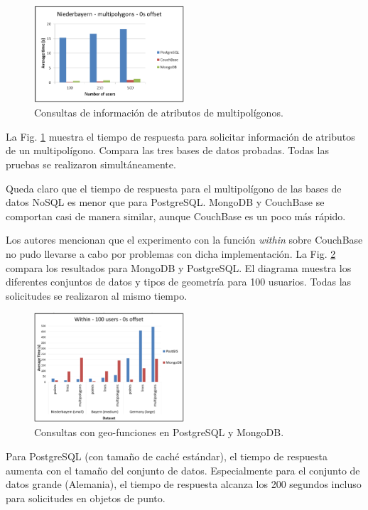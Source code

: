 \documentclass[pdflatex,sn-mathphys-num]{sn-jnl}
\theoremstyle{thmstyleone}%
\theoremstyle{thmstyletwo}%
\theoremstyle{thmstylethree}%
\begin{document}
\begin{figure}
    \centering
    \includegraphics[width=0.5\textwidth]{figs/geo-g1.png}
    \caption{Consultas de información de atributos de multipolígonos.}
    \label{geo-g1}
\end{figure}

La Fig. \ref{geo-g1} muestra el tiempo de respuesta para solicitar información de atributos de un multipolígono. Compara las tres bases de datos probadas. Todas las pruebas se realizaron simultáneamente.

Queda claro que el tiempo de respuesta para el multipolígono de las bases de datos NoSQL es menor que para PostgreSQL. MongoDB y CouchBase se comportan casi de manera similar, aunque CouchBase es un poco más rápido.

Los autores mencionan que el experimento con la función \textit{within} sobre CouchBase no pudo llevarse a cabo por problemas con dicha implementación. La Fig. \ref{geo-g2} compara los resultados para MongoDB y PostgreSQL. El diagrama muestra los diferentes conjuntos de datos y tipos de geometría para 100 usuarios. Todas las solicitudes se realizaron al mismo tiempo.

\begin{figure}
    \centering
    \includegraphics[width=0.5\textwidth]{figs/geo-g2.png}
    \caption{Consultas con geo-funciones en PostgreSQL y MongoDB.}
    \label{geo-g2}
\end{figure}

Para PostgreSQL (con tamaño de caché estándar), el tiempo de respuesta aumenta con el tamaño del conjunto de datos. Especialmente para el conjunto de datos grande (Alemania), el tiempo de respuesta alcanza los 200 segundos incluso para solicitudes en objetos de punto.
\end{document}
